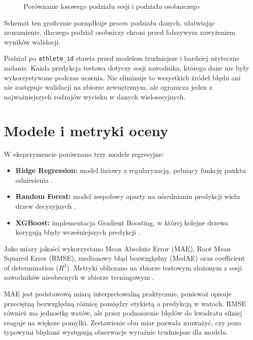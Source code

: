 \begin{figure}[htbp]
\centering
\resizebox{\textwidth}{!}{%
%
}
\caption{Porównanie losowego podziału sesji i podziału osobniczego}
\label{fig:leakage_subject_split}
\end{figure}

Schemat ten graficznie porządkuje proces podziału danych, ułatwiając zrozumienie, dlaczego podział osobniczy chroni przed fałszywym zawyżeniem wyników walidacji.

Podział po \texttt{athlete\_id} stawia przed modelem trudniejsze i bardziej użyteczne zadanie. Każda predykcja testowa dotyczy sesji zawodnika, którego dane nie były wykorzystywane podczas uczenia. Nie eliminuje to wszystkich źródeł błędu ani nie zastępuje walidacji na zbiorze zewnętrznym, ale ogranicza jeden z najważniejszych rodzajów wycieku w danych wielosesyjnych.

\section{Modele i metryki oceny}

W eksperymencie porównano trzy modele regresyjne:
\begin{itemize}
    \item \textbf{Ridge Regression:} model liniowy z regularyzacją, pełniący funkcję punktu odniesienia \parencite{hoerl1970ridge}.
    \item \textbf{Random Forest:} model zespołowy oparty na uśrednianiu predykcji wielu drzew decyzyjnych \parencite{breiman2001random}.
    \item \textbf{XGBoost:} implementacja Gradient Boosting, w której kolejne drzewa korygują błędy wcześniejszych predykcji \parencite{chen2016xgboost}.
\end{itemize}

Jako miary jakości wykorzystano Mean Absolute Error (MAE), Root Mean Squared Error (RMSE), medianowy błąd bezwzględny (MedAE) oraz coefficient of determination ($R^2$). Metryki obliczano na zbiorze testowym złożonym z sesji zawodników nieobecnych w zbiorze treningowym \parencite{chai2014rmseMae}.

MAE jest podstawową miarą interpretowalną praktycznie, ponieważ opisuje przeciętną bezwzględną różnicę pomiędzy etykietą a predykcją w watach. RMSE również ma jednostkę watów, ale przez podnoszenie błędów do kwadratu silniej reaguje na większe pomyłki. Zestawienie obu miar pozwala zauważyć, czy poza typowymi błędami występują obserwacje wyraźnie trudniejsze dla modelu.

